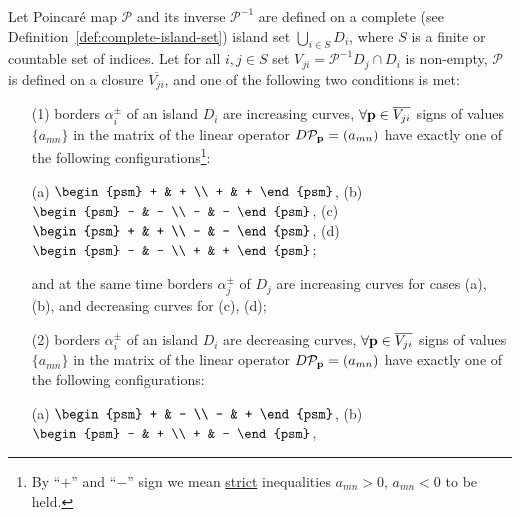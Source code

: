 \begin{theorem}
	Let Poincar\'e map $\mathcal{P}$ and its inverse $\mathcal{P}^{-1}$ are defined on a complete (see Definition~\ref{def:complete-island-set}) island set $\bigcup_{i \in S} D_i$, where $S$ is a finite or countable set of indices.
	Let for all $i, j \in S$ set $V_{ji} = \mathcal{P}^{-1} D_j \cap D_i$ is non-empty, $\mathcal{P}$ is defined on a
	 closure $\overline{V_{ji}}$, and one of the following two conditions is met:
	\begin{enumerate}
		\item[(1)] borders $\alpha_i^{\pm}$ of an island $D_i$ are increasing curves, $\forall \vb{p} \in \overline{V_{ji}}$ signs of values $\{ a_{mn} \}$ in the matrix of the linear operator $D \mathcal{P}_{\vb{p}} = (a_{mn})$ have exactly one of the following configurations\footnote{By ``$+$'' and ``$-$'' sign we mean \underline{strict} inequalities $a_{mn} > 0$, $a_{mn} < 0$ to be held.}:
			\begin{center}
				(a) $\begin{psm} + & + \\ + & + \end{psm}$, \quad
				(b) $\begin{psm} - & - \\ - & - \end{psm}$, \quad
				(c) $\begin{psm} + & + \\ - & - \end{psm}$, \quad
				(d) $\begin{psm} - & - \\ + & + \end{psm}$;
			\end{center}
			and at the same time borders $\alpha_j^{\pm}$ of $D_j$ are increasing curves for cases (a), (b), and decreasing curves for (c), (d);
		\item[(2)] borders $\alpha_i^{\pm}$ of an island $D_i$ are decreasing curves, $\forall \vb{p} \in \overline{V_{ji}}$ signs of values $\{ a_{mn} \}$ in the matrix of the linear operator $D \mathcal{P}_{\vb{p}} = (a_{mn})$ have exactly one of the following configurations:
			\begin{center}
				(a) $\begin{psm} + & - \\ - & + \end{psm}$, \quad
				(b) $\begin{psm} - & + \\ + & - \end{psm}$,	\quad

\end{center}
\end{enumerate}
\end{theorem}
